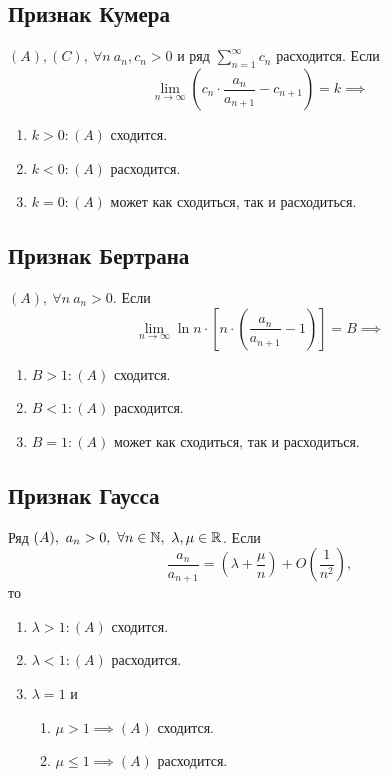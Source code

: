 \subsection{Признак Кумера}

\begin{theorem}
    $ (A),(C), \ \forall n \ a_n,c_n > 0 $ и ряд $\sum_{n=1}^{\infty}c_n$ расходится. Если
    \[
        \underset{n\rightarrow\infty}{\lim}\left(c_n \cdot \frac{a_n}{a_{n+1}} - c_{n+1}\right) = k \implies
    \]
    \begin{enumerate}
        \item $k > 0: (A)$ сходится.
        \item $k < 0: (A)$ расходится.
        \item $k = 0: (A)$ может как сходиться, так и расходиться.
    \end{enumerate}
\end{theorem}

\subsection{Признак Бертрана}

\begin{theorem}
    $(A), \ \forall n \ a_n > 0$. Если
    \[
        \underset{n\rightarrow\infty}{\lim} \ln n \cdot \left[n \cdot \left(\frac{a_n}{a_{n+1}} - 1\right)\right] = B \implies
    \]
    \begin{enumerate}
        \item $B > 1: (A)$ сходится.
        \item $B < 1: (A)$ расходится.
        \item $B = 1: (A)$ может как сходиться, так и расходиться.
    \end{enumerate}
\end{theorem}

\newpage

\subsection{Признак Гаусса}

\begin{theorem}
    Ряд $(A), \ a_n > 0, \ \forall n \in \mathbb{N}, \ \lambda, \mu \in \mathbb{R}$. Если
    \[
        \frac{a_n}{a_{n+1}} = \left(\lambda + \frac{\mu}{n}\right) + O\left(\frac{1}{n^2}\right),
    \]
    то
    \begin{enumerate}
        \item $\lambda > 1: (A)$ сходится.
        \item $\lambda < 1: (A)$ расходится.
        \item $\lambda = 1$ и \begin{enumerate}
                  \item $\mu > 1 \implies (A)$ сходится.
                  \item $\mu \leqslant 1 \implies (A)$ расходится.
              \end{enumerate}
    \end{enumerate}
\end{theorem}

